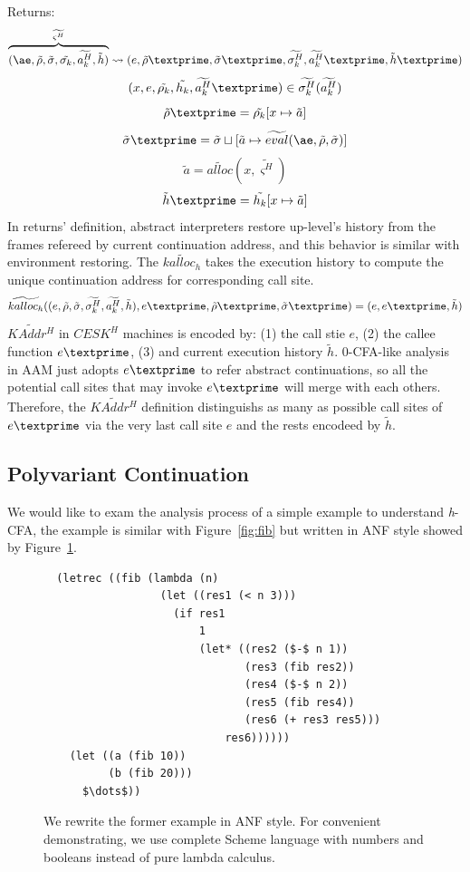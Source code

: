 \documentclass{article}
\begin{document}
Returns:
\[
\overbrace{
(\ae, \tilde{\rho}, \tilde{\sigma}, \tilde{\sigma_k}, \widetilde{a_k^H}, \tilde{h})
}^{\widetilde{\varsigma^H}}
\leadsto (e, \tilde{\rho}\textprime, \tilde{\sigma}\textprime, \widetilde{\sigma_k^H}, \widetilde{a_k^H}\textprime, \tilde{h}\textprime)
\]
\[
(x, e, \tilde{\rho_k}, \tilde{h_k}, \widetilde{a_k^H}\textprime) \in \widetilde{\sigma_k^H}(\widetilde{a_k^H})
\]
\[
\tilde{\rho}\textprime = \tilde{\rho_k}[x \mapsto \tilde{a}]
\]
\[
\tilde{\sigma}\textprime = \tilde{\sigma} \sqcup [\tilde{a} \mapsto \widetilde{eval}(\ae, \tilde{\rho}, \tilde{\sigma})]
\]
\[
\tilde{a} = \widetilde{alloc}(x, \widetilde{\varsigma^H})
\]
\[
\tilde{h}\textprime = \tilde{h_k}[x \mapsto \tilde{a}]
\]
In returns' definition, abstract interpreters restore up-level's history from the frames refereed by current continuation address, and this behavior is similar with environment restoring.
The $\widetilde{kalloc_h}$ takes the execution history to compute the unique continuation address for corresponding call site.
\[
\widetilde{kalloc_h} ((e, \tilde{\rho}, \tilde{\sigma}, \widetilde{\sigma_k^H}, \widetilde{a_k^H}, \tilde{h}), e\textprime, \tilde{\rho}\textprime, \tilde{\sigma}\textprime) =
(e, e\textprime, \tilde{h})
\]
$\widetilde{KAddr^H}$ in $CESK^H$ machines is encoded by: (1) the call stie $e$, (2) the callee function $e\textprime$, (3) and current execution history $\tilde{h}$. 0-CFA-like analysis in AAM just adopts $e\textprime$ to refer abstract continuations, so all the potential call sites that may invoke $e\textprime$ will merge with each others. Therefore, the $\widetilde{KAddr^H}$ definition distinguishs as many as possible call sites of $e\textprime$ via the very last call site $e$ and the rests encodeed by $\tilde{h}$.

\subsection{Polyvariant Continuation}
\label{sub:Polyvariant Continuation}
We would like to exam the analysis process of a simple example to understand \textit{h}-CFA, the example is similar with Figure~\ref{fig:fib} but written in ANF style showed by Figure~\ref{fig:anf-fib}.

\begin{figure}
\small
{}
\begin{lstlisting}
  (letrec ((fib (lambda (n)
                  (let ((res1 (< n 3)))
                    (if res1
                        1
                        (let* ((res2 ($-$ n 1))
                               (res3 (fib res2))
                               (res4 ($-$ n 2))
                               (res5 (fib res4))
                               (res6 (+ res3 res5)))
                            res6))))))
    (let ((a (fib 10))
          (b (fib 20)))
      $\dots$))
\end{lstlisting}
\caption{
We rewrite the former example in ANF style.
For convenient  demonstrating, we use complete Scheme language with numbers and booleans instead of pure lambda calculus.
}
\label{fig:anf-fib}
\end{figure}
\end{document}
